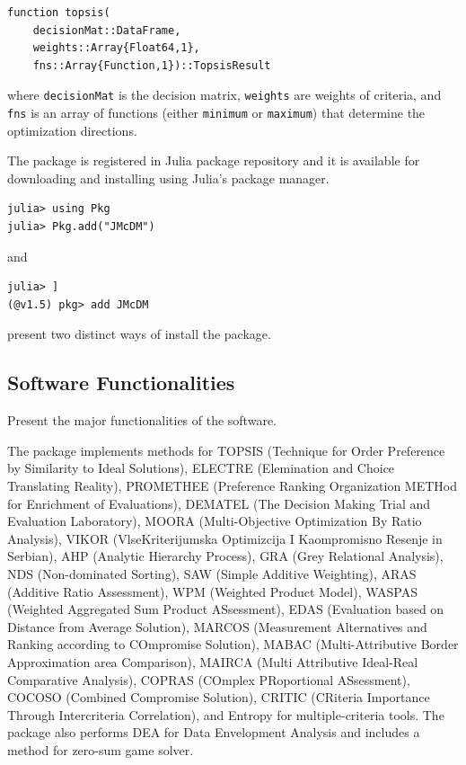 \documentclass[authoryear,preprint,review,12pt]{elsarticle}
\begin{document}
\begin{verbatim}
function topsis(
    decisionMat::DataFrame, 
    weights::Array{Float64,1}, 
    fns::Array{Function,1})::TopsisResult
\end{verbatim} 

\noindent where \texttt{decisionMat} is the decision matrix, \texttt{weights} are weights of criteria, and \texttt{fns} is an array of functions (either \texttt{minimum} or \texttt{maximum}) that determine the optimization directions. 

The package is registered in Julia package repository and it is available for downloading and installing using Julia's package manager.  

\begin{verbatim}
julia> using Pkg
julia> Pkg.add("JMcDM")
\end{verbatim}

\noindent and 

\begin{verbatim}
julia> ]
(@v1.5) pkg> add JMcDM
\end{verbatim}

\noindent present two distinct ways of install the package.


\subsection{Software Functionalities}
\label{section:softwareFunc}
{\color{red}Present the major functionalities of the software.}

The package implements methods for 
TOPSIS (Technique for Order Preference by Similarity to Ideal Solutions)\cite{topsis}, 
ELECTRE (Elemination and Choice Translating Reality)\cite{electre}, 
PROMETHEE (Preference Ranking Organization METHod for Enrichment of Evaluations)\cite{promethee}, 
DEMATEL (The Decision Making Trial and Evaluation Laboratory)\cite{dematel}, 
MOORA (Multi-Objective Optimization By Ratio Analysis)\cite{moora}, 
VIKOR (VlseKriterijumska Optimizcija I Kaompromisno Resenje in Serbian)\cite{vikor_1, vikor_2}, 
AHP (Analytic Hierarchy Process)\cite{ahp}, 
GRA (Grey Relational Analysis)\cite{gra}, 
NDS (Non-dominated Sorting)\cite{Deb_2002}, 
SAW (Simple Additive Weighting)\cite{saw, wsm_wpm}, 
ARAS (Additive Ratio Assessment)\cite{aras}, 
WPM (Weighted Product Model)\cite{wsm_wpm}, 
WASPAS (Weighted Aggregated Sum Product ASsessment)\cite{waspas}, 
EDAS (Evaluation based on Distance from Average Solution)\cite{edas}, 
MARCOS (Measurement Alternatives and Ranking according to COmpromise Solution)\cite{marcos}, 
MABAC (Multi-Attributive Border Approximation area Comparison)\cite{mabac}, 
MAIRCA (Multi Attributive Ideal-Real Comparative Analysis)\cite{mairca}, 
COPRAS (COmplex PRoportional ASsessment)\cite{copras}, 
COCOSO (Combined Compromise Solution)\cite{cocoso}, 
CRITIC (CRiteria Importance Through Intercriteria Correlation)\cite{critic},
and Entropy\cite{entropy} for multiple-criteria tools. 
The package also performs DEA for Data Envelopment Analysis\cite{dea} and includes a method for zero-sum game solver.  
\end{document}

